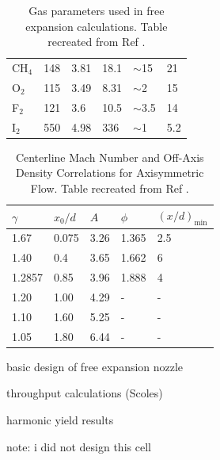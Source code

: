 \begin{table}[]
\begin{tabular}{llllll}
		CH$_4$ & 148                & 3.81                & 18.1                                    & $\sim$15  & 21                                                               \\
		O$_2$  & 115                & 3.49                & 8.31                                    & $\sim$2   & 15                                                               \\
		F$_2$  & 121                & 3.6                 & 10.5                                    & $\sim$3.5 & 14                                                               \\
		I$_2$  & 550                & 4.98                & 336                                     & $\sim$1   & 5.2                                                              \\ \hline
	\end{tabular}
\caption{Gas parameters used in free expansion calculations. Table recreated from Ref \cite{millerFreeJetSources1988}.}
\label{tbl:Scoles_gas_params2.1}
\end{table}

\begin{table}[]
	\centering
	\begin{tabular}{lllll}
		\hline
		$\gamma$ & $x_0/d$ & $A$  & $\phi$ & $(x/d)_{\text{min}}$ \\ \hline
		1.67     & 0.075   & 3.26 & 1.365  & 2.5                  \\
		1.40     & 0.4     & 3.65 & 1.662  & 6                    \\
		1.2857   & 0.85    & 3.96 & 1.888  & 4                    \\
		1.20     & 1.00    & 4.29 & -      & -                    \\
		1.10     & 1.60    & 5.25 & -      & -                    \\
		1.05     & 1.80    & 6.44 & -      & -                    \\ \hline
	\end{tabular}
\caption{Centerline Mach Number and Off-Axis Density Correlations for Axisymmetric Flow. Table recreated from Ref \cite{millerFreeJetSources1988}.}
\label{tbl:Scoles_mach_params}
\end{table}

basic design of free expansion nozzle

throughput calculations (Scoles)

harmonic yield results

note: i did not design this cell

